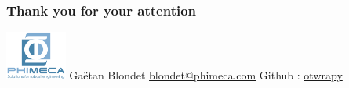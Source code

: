 \documentclass[10pt, aspectratio=169]{beamer}
\begin{document}
\begin{frame}
\frametitle{Thank you for your attention}

\begin{center}
\includegraphics[width=0.15\textwidth]{./figure/LogoPhiHaut-white.png}
\vfill
Gaëtan Blondet
\vfill
\href{mailto:blondet@phimeca.com}{blondet@phimeca.com}
\vfill
Github : \href{http://openturns.github.io/otwrapy/master/index.html}{otwrapy}
\end{center}
\end{frame}
\end{document}
